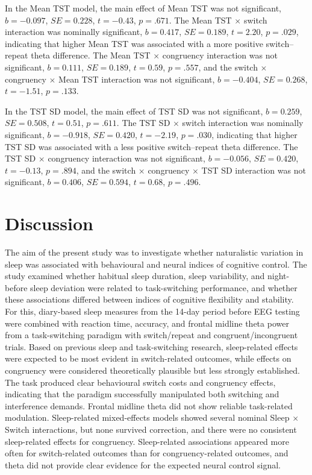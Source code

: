 \documentclass[12pt,a4paper]{report}
\begin{document}
In the Mean TST model, the main effect of Mean TST was not significant, \(b = -0.097\), \(SE = 0.228\), \(t = -0.43\), \(p = .671\). The Mean TST \(\times\) switch interaction was nominally significant, \(b = 0.417\), \(SE = 0.189\), \(t = 2.20\), \(p = .029\), indicating that higher Mean TST was associated with a more positive switch--repeat theta difference. The Mean TST \(\times\) congruency interaction was not significant, \(b = 0.111\), \(SE = 0.189\), \(t = 0.59\), \(p = .557\), and the switch \(\times\) congruency \(\times\) Mean TST interaction was not significant, \(b = -0.404\), \(SE = 0.268\), \(t = -1.51\), \(p = .133\).

In the TST SD model, the main effect of TST SD was not significant, \(b = 0.259\), \(SE = 0.508\), \(t = 0.51\), \(p = .611\). The TST SD \(\times\) switch interaction was nominally significant, \(b = -0.918\), \(SE = 0.420\), \(t = -2.19\), \(p = .030\), indicating that higher TST SD was associated with a less positive switch--repeat theta difference. The TST SD \(\times\) congruency interaction was not significant, \(b = -0.056\), \(SE = 0.420\), \(t = -0.13\), \(p = .894\), and the switch \(\times\) congruency \(\times\) TST SD interaction was not significant, \(b = 0.406\), \(SE = 0.594\), \(t = 0.68\), \(p = .496\).



\chapter{Discussion}

The aim of the present study was to investigate whether naturalistic variation in sleep was associated with behavioural and neural indices of cognitive control. The study examined whether habitual sleep duration, sleep variability, and night-before sleep deviation were related to task-switching performance, and whether these associations differed between indices of cognitive flexibility and stability. For this, diary-based sleep measures from the 14-day period before EEG testing were combined with reaction time, accuracy, and frontal midline theta power from a task-switching paradigm with switch/repeat and congruent/incongruent trials. Based on previous sleep and task-switching research, sleep-related effects were expected to be most evident in switch-related outcomes, while effects on congruency were considered theoretically plausible but less strongly established. The task produced clear behavioural switch costs and congruency effects, indicating that the paradigm successfully manipulated both switching and interference demands. Frontal midline theta did not show reliable task-related modulation. Sleep-related mixed-effects models showed several nominal Sleep \(\times\) Switch interactions, but none survived correction, and there were no consistent sleep-related effects for congruency. Sleep-related associations appeared more often for switch-related outcomes than for congruency-related outcomes, and theta did not provide clear evidence for the expected neural control signal.
\end{document}
